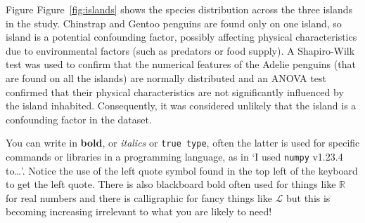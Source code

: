 \documentclass[12pt]{article}
\begin{document}
Figure Figure~\ref{fig:islands} shows the species distribution across the three islands in the study. 
Chinstrap and Gentoo penguins are found only on one island, so island is a potential confounding factor, 
possibly affecting physical characteristics due to environmental factors (such as predators or food supply). 
A Shapiro-Wilk test was used to confirm that the numerical features of the Adelie penguins (that are found on 
all the islands) are normally distributed and an ANOVA test confirmed that their physical characteristics are not significantly influenced by the island inhabited. 
Consequently, it was considered unlikely that the island is a confounding factor in the dataset.




You can write in \textbf{bold}, or \textsl{italics} or \texttt{true
  type}, often the latter is used for specific commands or libraries in a
programming language, as in `I used \texttt{numpy} v1.23.4 to\ldots'. Notice the use of the left quote symbol found in the top left of the keyboard to get the left quote. There is also blackboard bold often used for things like $\mathbb{R}$ for real numbers and there is calligraphic for fancy things like $\mathcal{L}$ but this is becoming increasing irrelevant to what you are likely to need! 




\printbibliography
\end{document}
